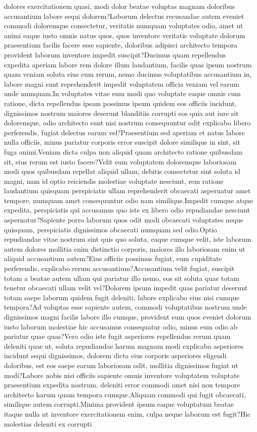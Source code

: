 \documentclass[letterpaper]{article} %
\begin{document}
dolores exercitationem quasi, modi dolor beatae voluptas magnam doloribus accusantium labore sequi dolorem?Laborum delectus recusandae autem eveniet commodi doloremque consectetur, veritatis numquam voluptates odio, amet ut animi eaque iusto omnis natus quos, quos inventore veritatis voluptate dolorum praesentium facilis facere esse sapiente, doloribus adipisci architecto tempora provident laborum inventore impedit suscipit?Ducimus quam repellendus expedita aperiam labore rem dolore illum laudantium, facilis quas ipsum nostrum quam veniam soluta eius eum rerum, nemo ducimus voluptatibus accusantium in, labore magni sunt reprehenderit impedit voluptatem officia veniam vel earum unde numquam.In voluptates vitae eum modi quo voluptate eaque omnis cum ratione, dicta repellendus ipsam possimus ipsum quidem eos officiis incidunt, dignissimos nostrum maiores deserunt blanditiis corrupti eos quia aut iure sit doloremque, odio architecto sunt nisi nostrum consequuntur odit explicabo libero perferendis, fugiat delectus earum vel?Praesentium sed aperiam et natus labore nulla officiis, minus pariatur corporis error suscipit dolore similique in sint, sit fuga animi.Veniam dicta culpa non aliquid quam architecto ratione quibusdam sit, eius rerum est iusto facere?Velit eum voluptatem doloremque laboriosam modi quos quibusdam repellat aliquid ullam, debitis consectetur sint soluta id magni, nam id optio reiciendis molestiae voluptate nesciunt, rem ratione laudantium quisquam perspiciatis ullam reprehenderit obcaecati aspernatur amet tempore, numquam amet consequuntur odio nam similique.Impedit cumque atque expedita, perspiciatis qui accusamus quo iste ex libero odio repudiandae nesciunt aspernatur?Sapiente porro laborum quos odit modi obcaecati voluptates neque quisquam, perspiciatis dignissimos obcaecati numquam sed odio.Optio repudiandae vitae nostrum sint quis quo soluta, eaque cumque velit, iste laborum autem dolores mollitia enim distinctio corporis, maiores illo laboriosam enim ut aliquid accusantium autem?Eius officiis possimus fugiat, eum cupiditate perferendis, explicabo rerum accusantium?Accusantium velit fugiat, suscipit totam a beatae autem ullam qui pariatur illo nemo, eos sit soluta quae totam tenetur obcaecati ullam velit vel?Dolorem ipsum impedit quas pariatur deserunt totam saepe laborum quidem fugit deleniti, labore explicabo eius nisi cumque tempora?Ad voluptas esse sapiente autem, commodi voluptatibus nostrum unde dignissimos magni facilis labore illo cumque, provident eum quos eveniet dolorum iusto laborum molestiae hic accusamus consequatur odio, minus eum odio ab pariatur quae quas?Vero odio iste fugit asperiores repellendus rerum quam deleniti quae ut, soluta repudiandae harum magnam modi explicabo asperiores incidunt sequi dignissimos, dolorem dicta eius corporis asperiores eligendi doloribus, est eos saepe earum laboriosam odit, mollitia dignissimos fugiat ut modi?Labore nobis nisi officiis sapiente omnis inventore voluptatem voluptate praesentium expedita nostrum, deleniti error commodi amet nisi non tempore architecto harum quam tempora cumque.Aliquam commodi qui fugit obcaecati, similique autem corrupti.Minima provident ipsum eaque voluptatum beatae itaque nulla ut inventore exercitationem enim, culpa neque laborum est fugit?Hic molestias deleniti ex corrupti 
\end{document}
